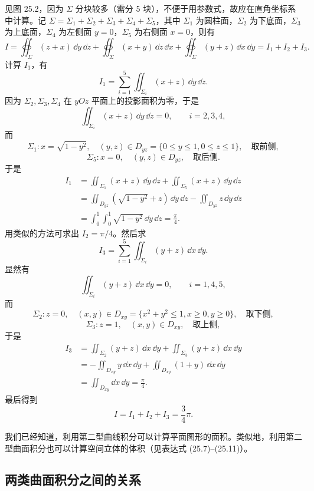 \begin{xsolution}
见图 25.2，因为 $\Sigma$ 分块较多（需分 5 块），不便于用参数式，故应在直角坐标系中计算。记 $\Sigma=\Sigma_1+\Sigma_2+\Sigma_3+\Sigma_4+\Sigma_5$，其中 $\Sigma_1$ 为圆柱面，$\Sigma_2$ 为下底面，$\Sigma_3$ 为上底面，$\Sigma_4$ 为左侧面 $y=0$，$\Sigma_5$ 为右侧面 $x=0$，则有
\[
  I=\oiint_\Sigma(z+x)\,\dd y\,\dd z+
  \oiint_\Sigma(x+y)\,\dd z\,\dd x+
  \oiint_\Sigma(y+z)\,\dd x\,\dd y=I_1+I_2+I_3.
\]
计算 $I_1$，有
\[
  I_1=\sum_{i=1}^5\iint_{\Sigma_i}(x+z)\,\dd y\,\dd z.
\]
因为 $\Sigma_2,\Sigma_3,\Sigma_4$ 在 $yOz$ 平面上的投影面积为零，于是
\[
  \iint_{\Sigma_i}(x+z)\,\dd y\,\dd z=0,\qquad i=2,3,4,
\]
而
\[
  \Sigma_1:x=\sqrt{1-y^2},\quad(y,z)\in D_{yz}=\{0\le y\le1,0\le z\le1\},\quad\text{取前侧},
\]
\[
  \Sigma_5:x=0,\quad(y,z)\in D_{yz},\quad\text{取后侧}.
\]
于是
\begin{align*}
I_1&=\iint_{\Sigma_1}(x+z)\,\dd y\,\dd z+\iint_{\Sigma_5}(x+z)\,\dd y\,\dd z\\
&=\iint_{D_{yz}}(\sqrt{1-y^2}+z)\,\dd y\,\dd z-
\iint_{D_{yz}}z\,\dd y\,\dd z\\
&=\int_0^1\int_0^1\sqrt{1-y^2}\,\dd y\,\dd z=\frac\pi4.
\end{align*}
用类似的方法可求出 $I_2=\pi/4$。然后求
\[
  I_3=\sum_{i=1}^5\iint_{\Sigma_i}(y+z)\,\dd x\,\dd y.
\]
显然有
\[
  \iint_{\Sigma_i}(y+z)\,\dd x\,\dd y=0,\qquad i=1,4,5,
\]
而
\[
  \Sigma_2:z=0,\quad(x,y)\in D_{xy}=\{x^2+y^2\le1,x\ge0,y\ge0\},\quad\text{取下侧},
\]
\[
  \Sigma_3:z=1,\quad(x,y)\in D_{xy},\quad\text{取上侧},
\]
于是
\begin{align*}
I_3&=\iint_{\Sigma_2}(y+z)\,\dd x\,\dd y+\iint_{\Sigma_3}(y+z)\,\dd x\,\dd y\\
&=-\iint_{D_{xy}}y\,\dd x\,\dd y+\iint_{D_{xy}}(1+y)\,\dd x\,\dd y\\
&=\iint_{D_{xy}}\dd x\,\dd y=\frac\pi4.
\end{align*}
最后得到
\[
  I=I_1+I_2+I_3=\frac34\pi.
\]
\end{xsolution}

\begin{xremark}
我们已经知道，利用第二型曲线积分可以计算平面图形的面积。类似地，利用第二型曲面积分也可以计算空间立体的体积（见表达式 (25.7)--(25.11)）。
\end{xremark}

\subsection{两类曲面积分之间的关系}

